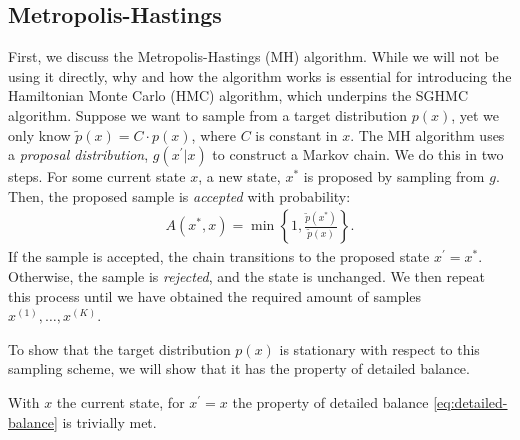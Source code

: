 \subsection{Metropolis-Hastings}
First, we discuss the Metropolis-Hastings (MH) algorithm.
While we will not be using it directly, why and how the algorithm works is essential for introducing the Hamiltonian Monte Carlo (HMC) algorithm, which underpins the SGHMC algorithm.
Suppose we want to sample from a target distribution $p(x)$, yet we only know $\tilde{p}(x) = C \cdot p(x)$, where $C$ is constant in $x$.
The MH algorithm uses a \emph{proposal distribution}, $g(x^\prime|x)$ to construct a Markov chain.
We do this in two steps.
For some current state $x$, a new state, $x^\ast$ is proposed by sampling from $g$.
Then, the proposed sample is \emph{accepted} with probability:
\begin{align}
    A(x^{\ast}, x) = \min\left\{1, \frac{\tilde{p}(x^\ast)}{\tilde{p}(x)}\right\}.
\end{align}
If the sample is accepted, the chain transitions to the proposed state $x^\prime = x^\ast$.
Otherwise, the sample is \emph{rejected}, and the state is unchanged.
We then repeat this process until we have obtained the required amount of samples $x^{(1)},\dots,x^{(K)}$. 

To show that the target distribution $p(x)$ is stationary with respect to this sampling scheme, we will show that it has the property of detailed balance.

With $x$ the current state, for $x^\prime=x$ the property of detailed balance \cref{eq:detailed-balance} is trivially met.

